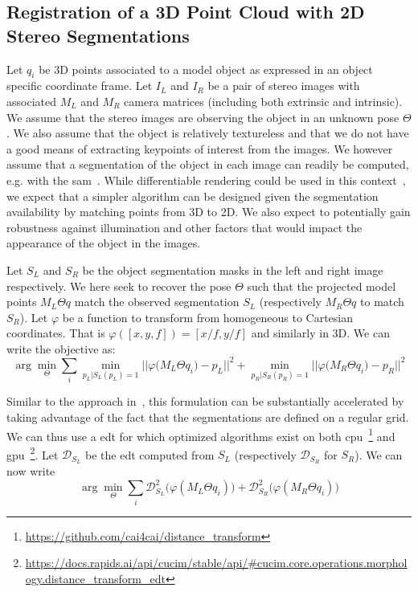 \subsection{Registration of a 3D Point Cloud with 2D Stereo Segmentations}
\label{in:sec:registration_of_3d_point_cloud}
%
Let $q_i$ be 3D points associated to a model object as expressed in an object specific coordinate frame.
Let $I_L$ and $I_R$ be a pair of stereo images with associated $M_L$ and $M_R$ camera matrices (including both extrinsic and intrinsic).
We assume that the stereo images are observing the object in an unknown pose $\Theta$.
We also assume that the object is relatively textureless and that we do not have a good means of extracting keypoints of interest from the images.
We however assume that a segmentation of the object in each image can readily be computed, e.g. with the \gls{sam}~\cite{Kirillov:arxiv:2023}.
%
While differentiable rendering could be used in this context~\cite{Hannemose:SPIE:2019,Labbe:CVPR:2021,Chen:RAL:2023},
we expect that a simpler algorithm can be designed given the segmentation availability by matching points from 3D to 2D.
We also expect to potentially gain robustness against illumination and other factors that would impact the appearance of the object in the images.

Let $S_L$ and $S_R$ be the object segmentation masks in the left and right image respectively.
We here seek to recover the pose $\Theta$ such that the projected model points ${M_L \Theta q}$ match the observed segmentation $S_L$ (respectively ${M_R \Theta q}$ to match $S_R$).
Let $\varphi$ be a function to transform from homogeneous to Cartesian coordinates.
That is $\varphi([x,y,f])=[x/f,y/f]$ and similarly in 3D.
We can write the objective as:
\begin{equation}
\arg\min_{\Theta} \sum_i
\min_{p_L|S_L(p_L)=1}|| \varphi\big(M_L \Theta q_i\big) - p_L||^2
+ \min_{p_R|S_R(p_R)=1}|| \varphi\big(M_R \Theta q_i\big) - p_R||^2
\end{equation}

Similar to the approach in~\cite{Fitzgibbon:IVC:2003}, this formulation can be substantially accelerated by taking advantage of the fact that the segmentations are defined on a regular grid. We can thus use a \gls{edt} for which optimized algorithms exist on both \gls{cpu}~\cite{Felzenszwalb:TC:2012}\footnote{\url{https://github.com/cai4cai/distance_transform}} and \gls{gpu}~\cite{Cao:SIGGRAPH:2010}\footnote{\url{https://docs.rapids.ai/api/cucim/stable/api/\#cucim.core.operations.morphology.distance_transform_edt}}.
Let $\mathcal{D}_{S_L}$ be the \gls{edt} computed from $S_L$ (respectively $\mathcal{D}_{S_R}$ for $S_R$).
We can now write
\begin{equation}\label{eq:dt3d2d}
\arg\min_{\Theta} \sum_i \mathcal{D}_{S_L}^2\big( \varphi(M_L \Theta q_i) \big)
+ \mathcal{D}_{S_R}^2\big( \varphi(M_R \Theta q_i) \big)
\end{equation}


